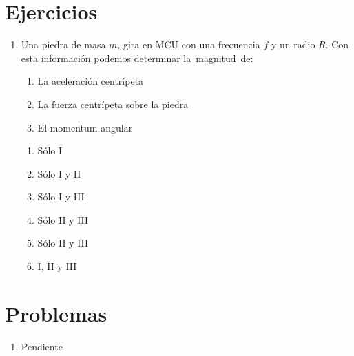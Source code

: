 \documentclass[letterpaper]{article}
\begin{document}
\section*{Ejercicios}

\begin{enumerate}

\item Una piedra de masa $m$, gira en MCU con una frecuencia $f$ y un radio $R$. Con esta información podemos determinar la magnitud de:

\begin{enumerate}[I]
\item La aceleración centrípeta
\item La fuerza centrípeta sobre la piedra
\item El momentum angular
\end{enumerate}

\begin{enumerate}[label=\Alph*)]
\item Sólo I
\item Sólo I y II
\item Sólo I y III
\item Sólo II y III
\item Sólo II y III
\item I, II y III
\end{enumerate}

\end{enumerate}

\section*{Problemas}

\begin{enumerate}

\item Pendiente

\end{enumerate}
\end{document}
